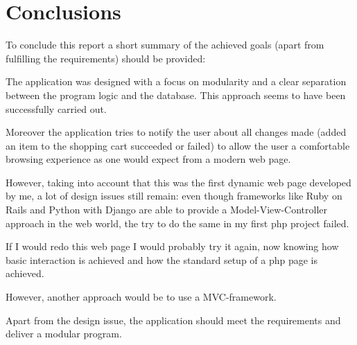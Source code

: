 \chapter{Conclusions}\label{ch:conclusions} %

To conclude this report a short summary of the achieved goals (apart from fulfilling the requirements) should be provided:

The application was designed with a focus on modularity and a clear separation between the program logic and the database. This approach seems to have been successfully carried out.

Moreover the application tries to notify the user about all changes made (added an item to the shopping cart succeeded or failed) to allow the user a comfortable browsing experience as one would expect from a modern web page.

However, taking into account that this was the first dynamic web page developed by me, a lot of design issues still remain: even though frameworks like Ruby on Rails and Python with Django are able to provide a Model-View-Controller approach in the web world, the try to do the same in my first php project failed.

If I would redo this web page I would probably try it again, now knowing how basic interaction is achieved and how the standard setup of a php page is achieved.

However, another approach would be to use a MVC-framework.

Apart from the design issue, the application should meet the requirements and deliver a modular program.